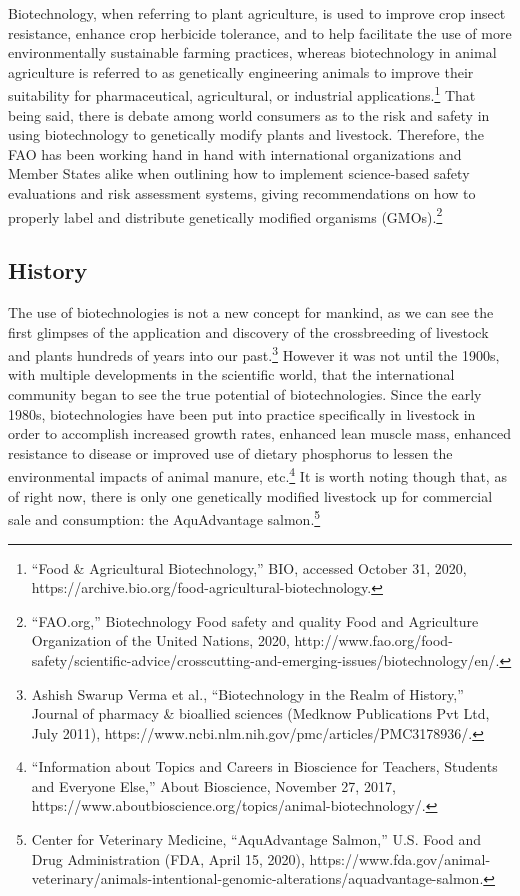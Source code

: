 \documentclass[10pt, letterpaper]{article}
\begin{document}
Biotechnology, when referring to plant agriculture, is used to improve
crop insect resistance, enhance crop herbicide tolerance, and to help
facilitate the use of more environmentally sustainable farming
practices, whereas biotechnology in animal agriculture is referred to as
genetically engineering animals to improve their suitability for
pharmaceutical, agricultural, or industrial applications.\footnote{``Food
  \& Agricultural Biotechnology,'' BIO, accessed October 31, 2020,
  https://archive.bio.org/food-agricultural-biotechnology.} That being
said, there is debate among world consumers as to the risk and safety in
using biotechnology to genetically modify plants and livestock.
Therefore, the FAO has been working hand in hand with international
organizations and Member States alike when outlining how to implement
science-based safety evaluations and risk assessment systems, giving
recommendations on how to properly label and distribute genetically
modified organisms (GMOs).\footnote{``FAO.org,'' Biotechnology
  \textbar{} Food safety and quality \textbar{} Food and Agriculture
  Organization of the United Nations, 2020,
  http://www.fao.org/food-safety/scientific-advice/crosscutting-and-emerging-issues/biotechnology/en/.} \\

\subsection{History}

The use of biotechnologies is not a new concept for mankind, as we can
see the first glimpses of the application and discovery of the
crossbreeding of livestock and plants hundreds of years into our
past.\footnote{Ashish Swarup Verma et al., ``Biotechnology in the Realm
  of History,'' Journal of pharmacy \& bioallied sciences (Medknow
  Publications Pvt Ltd, July 2011),
  https://www.ncbi.nlm.nih.gov/pmc/articles/PMC3178936/.} However it was
not until the 1900s, with multiple developments in the scientific world,
that the international community began to see the true potential of
biotechnologies. Since the early 1980s, biotechnologies have been put
into practice specifically in livestock in order to accomplish increased
growth rates, enhanced lean muscle mass, enhanced resistance to disease
or improved use of dietary phosphorus to lessen the environmental
impacts of animal manure, etc.\footnote{``Information about Topics and
  Careers in Bioscience for Teachers, Students and Everyone Else,''
  About Bioscience, November 27, 2017,
  https://www.aboutbioscience.org/topics/animal-biotechnology/.} It is
worth noting though that, as of right now, there is only one genetically
modified livestock up for commercial sale and consumption: the
AquAdvantage salmon.\footnote{Center for Veterinary Medicine,
  ``AquAdvantage Salmon,'' U.S. Food and Drug Administration (FDA, April
  15, 2020),
  https://www.fda.gov/animal-veterinary/animals-intentional-genomic-alterations/aquadvantage-salmon.} \\
\end{document}

